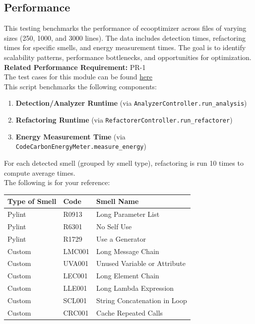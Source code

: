 \documentclass[12pt, titlepage]{article}
\begin{document}
\subsection{Performance}

This testing benchmarks the performance of ecooptimizer across 
files of varying sizes (250, 1000, and 3000 lines). The data includes detection times, 
refactoring times for specific smells, and energy measurement times. The goal is to 
identify scalability patterns, performance bottlenecks, and opportunities for optimization.\\

\textbf{Related Performance Requirement:} PR-1\\

\noindent The test cases for this module can be found \href{https://github.com/ssm-lab/capstone--source-code-optimizer/blob/new-poc/tests/benchmarking/benchmark.py}{here}\\

This script benchmarks the following components:

\begin{enumerate}
  \item \textbf{Detection/Analyzer Runtime} (via \texttt{AnalyzerController.run\_analysis})
  \item \textbf{Refactoring Runtime} (via \texttt{RefactorerController.run\_refactorer})
  \item \textbf{Energy Measurement Time} (via \texttt{CodeCarbonEnergyMeter.measure\_energy})
\end{enumerate}


For each detected smell (grouped by smell type), refactoring is run 10 times to compute average times.\\

\noindent The following is for your reference: \\

\begin{tabular}{|l|l|l|}
  \hline
  \textbf{Type of Smell} & \textbf{Code} & \textbf{Smell Name} \\
  \hline
  Pylint & R0913 & Long Parameter List \\
  Pylint & R6301 & No Self Use \\
  Pylint & R1729 & Use a Generator \\
  \hline
  Custom & LMC001 & Long Message Chain \\
  Custom & UVA001 & Unused Variable or Attribute \\
  Custom & LEC001 & Long Element Chain \\
  Custom & LLE001 & Long Lambda Expression \\
  Custom & SCL001 & String Concatenation in Loop \\
  Custom & CRC001 & Cache Repeated Calls \\
  \hline
\end{tabular}
\end{document}
